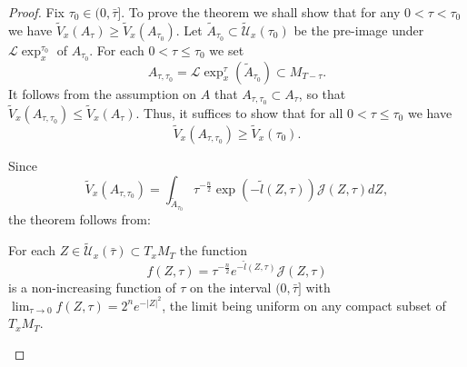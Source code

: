 \begin{proof}
Fix $\tau_0\in (0,\bar\tau]$. To prove the theorem we shall show
that for any $0<\tau<\tau_0$ we have $\widetilde V_x(A_\tau)\ge
\widetilde V_x(A_{\tau_0})$. Let $\widetilde A_{\tau_0}\subset
\widetilde {\mathcal U}_x(\tau_0)$ be the pre-image under ${\mathcal
L}\exp_x^{\tau_0}$ of $A_{\tau_0}$. For each $0<\tau\le \tau_0$
we set
$$A_{\tau,\tau_0}={\mathcal L}\exp_x^\tau(\widetilde
A_{\tau_0})\subset M_{T-\tau}.$$ It follows from the assumption on
$A$ that $A_{\tau,\tau_0}\subset A_\tau$, so that $\widetilde
V_x(A_{\tau,\tau_0})\le \widetilde V_x(A_\tau)$. Thus, it suffices
to show that for all $0<\tau\le \tau_0$ we have
$$\widetilde V_x(A_{\tau,\tau_0})\ge \widetilde V_x(\tau_0).$$

Since
$$ \widetilde V_x(A_{\tau,\tau_0})=\int_{\widetilde A_{\tau_0}} \tau^{-\frac{n}{2}}
\exp(-\tilde l(Z,\tau)){\mathcal J}(Z,\tau)dZ,$$ the theorem
follows from:



\begin{proposition}\label{prop:reduced-volume-integrand-monotone}
\label{fmonotone}
For each $Z\in \widetilde
{\mathcal U}_x(\bar\tau)\subset T_xM_T$ the function
$$f(Z,\tau)=\tau^{-\frac{n}{2}}e^{-\tilde l(Z,\tau)}{\mathcal J}(Z,\tau)$$
is a non-increasing function of $\tau$ on the interval
$(0,\bar\tau]$ with $\lim_{\tau\rightarrow
0}f(Z,\tau)=2^ne^{-|Z|^2}$, the limit being uniform on any compact
subset of $T_xM_T$.
\end{proposition}





\end{proof}
